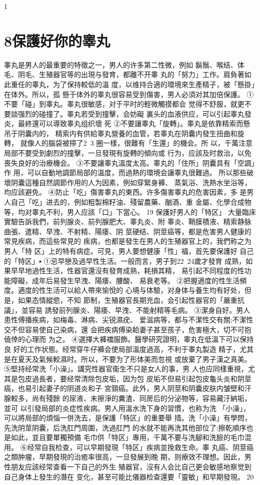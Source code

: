 \documentclass[12pt,UTF8]{ctexbook}
\begin{document}
1\section{8保護好你的睾丸}
睾丸是男人的最重要的特徵之一，男人的许多第二性微，例如
鬍鬚、喉结、体毛、阴毛、生殖器官等的出現与發育，都離不开睾
丸的「努力」工作。肩負著如此重任的睾丸，为了保持較低的溫
度，以维持合適的環境來生產精子，被「懸掛」在体外。所以，孤
懸于体外的睾丸很容易受到傷害，男人必須对其加倍保護。
①不要「碰」到睾丸。睾丸很敏感，对于平时的輕微觸摸都会
觉得不舒服，就更不要談强烈的碰撞了。睾丸若受到撞擊，会妨礙
裏头的血液供应，可以引起睾丸發炎，最終還可以導致睾丸组织壞
死
②不要讓睾丸「旋轉」。睾丸是依靠精索而懸吊于阴囊内的，
精索内有供給睾丸營養的血管，若睾丸在阴囊内發生扭曲和旋轉，
就像人的腦袋被擰了2~3 圈一樣，很難有「生還」的機会。所
以，千萬注意局部不要受到劇烈的撞擊，一旦發現有旋轉的傾向或
行为，应該及时救治，以免喪失良好的治療機会。
③不要讓睾丸溫度太高。睾丸的「住所」阴囊具有「空調」作
用，可以自動地調節局部的溫度，而過熱的環境会讓睾丸很難過。
所以那些破壞阴囊這種自然調節作用的人为因素，例如穿緊身褲、
蒸氣浴、洗熱水坐浴等，均应該避免。
④防止「吃」傷害睾丸的東西。许多傷害睾丸的危害因素，多
是男人自己「吃」进去的，例如粗製棉籽油、殘留農藥、酗酒、重
金屬、化學合成物等，均对睾丸不利，男人应該「口」下當心。
19 保護好男人的「特区」
大量臨床實驗告訴我們，前列腺炎、前列腺肥大、睾丸炎、附
睾炎、鞘膜積液、精索静脉曲張、遣精、早洩、不射精、陽痿、阴
莖硬结、阴莖癌等，都是危害男人健康的常見疾病，而這些常見的
疾病，也都是發生在男人的生殖器官上的，我們称之为男人「特
区」上的特有病症。可見，男人要想健康「性」福，首先要保護好
自己的「特区」▪
①忌早戀及過早性生活。一般而言，男子到22~24歲才發育
成熟，如果早早地過性生活，性器官還沒有發育成熟，耗損其精，
易引起不同程度的性功能障礙，成年后易發生早洩、陽痿、腰酸、
易衰老等。
②把握適度的性生活頻度。適度的性生活可以給人帶來愉悅的
心境与体驗，对身体与養生均有好处，但是，如果态情縱慾，不知
節制，生殖器官長期充血，会引起性器官的「嚴重抗議」，並容易
誘發前列腺炎、陽痿、早洩、不能射精等毛病。
③潔身自好。男人患性傅播疾病，如梅毒、淋病、尖锐濕疣、
爱滋病等，都与不潔性交有關;不潔性交不但容易使自己染病，還
会把疾病傅染耠妻子甚至孩子，危害極大，切不可抱僥倖的心理而
为之。
④選擇大褲襠服飾。醫學研究證明，睾丸在低溫下可以保持良
好的工作状態。经常穿牛仔褲会使局部溫度過高，不利于睾丸製造
精子，尤其是在夏天及氣候較濕时。所以，不要为了形体美而忽視
或放棄了男子漢之真美。
⑤堅持经常洗「小澡」。講究性器官衛生不只是女人的事，男
人也应同樣重視，尤其是包皮過長者，要经常清除包皮垢，因为包
皮垢不但易引起包皮龜头炎和阴莖癌，也易引起妻子的阴道炎和子
宮頸癌。此外，男人阴莖和阴囊皮肤内皱壁和汗腺較多，尚有殘餘
的尿液、未擦淨的糞渣、同房后的分泌物等，容易藏汙納垢，並可
以引發局部的炎症性疾病。男人用溫水洗下身的習慣，也称为洗
「小澡」，可以將局部的煩惱一併洗去，是保護「特区」的重要舉
措。洗「小澡」有學問，先洗阴莖阴囊，后洗肛門周圍，洗過肛門
的水就不能再洗其他部位了;擦乾順序也是如此，並且要單獨預備
毛巾供「特区」專用，千萬不要与洗腳和洗臉的毛巾混用。
⑥经常自我检查，可以早期發現「特区」疾病並挽救生命。睾
丸癌、阴莖癌之類肿瘤，早期發現的治癒率很高，一旦發展到晚
期，则療效不理想。因此，男性朋友应該经常查看一下自己的外生
殖器官，沒有人会比自己更会敏感地察觉到自己身体上發生的潛在
变化，甚至可能比儀器检查還要「靈敏」和早期發現。
20
\end{document}
